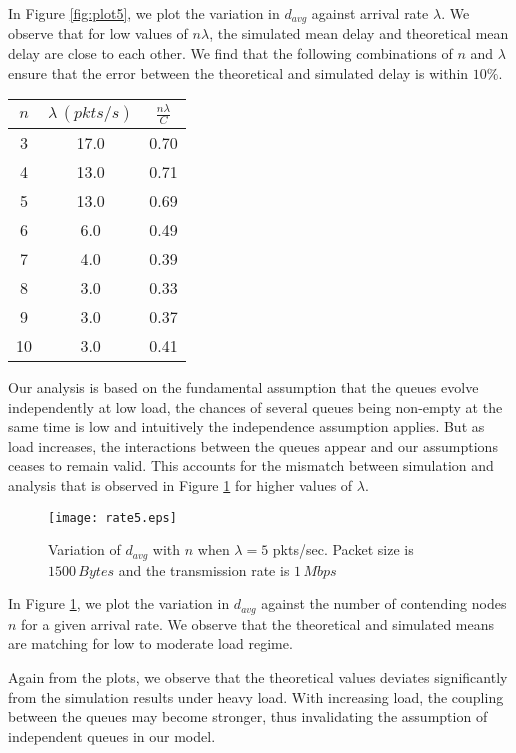 \documentclass[10pt, conference, compsocconf]{IEEEtran}
\begin{document}
\newpage
In Figure \ref{fig:plot5}, we plot the variation in $d_{avg}$ against arrival rate $\lambda$. We observe that for low values of $n \lambda$, the simulated mean delay and theoretical mean delay are close to each other. We find that the following combinations of $n$ and $\lambda$ ensure that the error between the theoretical and simulated delay is within $10\%$.

\begin{center}
\begin{tabular}{|c|c|c|}
\hline $n$ & $\lambda\,(pkts/s)$ & $\frac{n\lambda}{C}$\\  
\hline 3 &  17.0 & 0.70\\ 
\hline 4 &  13.0 & 0.71\\ 
\hline 5 &  13.0 & 0.69\\
\hline 6 &  6.0 & 0.49\\
\hline 7 &  4.0 & 0.39\\
\hline 8 &  3.0 & 0.33\\
\hline 9 &  3.0 & 0.37\\
\hline 10 & 3.0  & 0.41\\
\hline
\end{tabular} 
\end{center}

Our analysis is based on the fundamental assumption that the queues evolve independently at low load, the chances of several queues being non-empty at the same time is low and intuitively the independence assumption applies. But as load increases, the interactions between the queues appear and our assumptions ceases to remain valid. This accounts for the mismatch between simulation and analysis that is observed in Figure \ref{fig:rate5} for higher values of $\lambda$.
\begin{figure}[!h]
\centering
\texttt{[image: rate5.eps]}
\caption {Variation of $d_{avg}$ with $n$ when $\lambda = 5$ pkts/sec. Packet size is $1500\,Bytes$ and the transmission rate is $1\,Mbps$ }
\label{fig:rate5}
\end{figure}

In Figure \ref{fig:rate5}, we plot the variation in $d_{avg}$ against the number of contending nodes $n$ for a given arrival rate. We observe that the theoretical and simulated means are matching for low to moderate load regime. 

Again from the plots, we observe that the theoretical values deviates significantly from the simulation results under heavy load. With increasing load, the coupling between the queues may become stronger, thus invalidating the assumption of independent queues in our model. 
\end{document}
